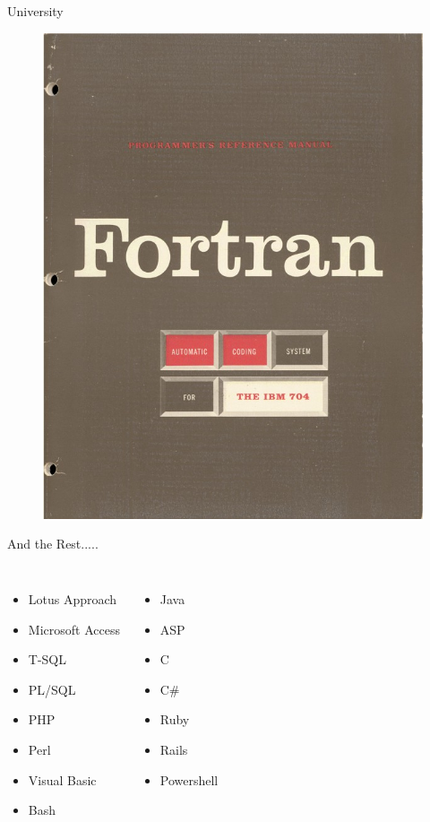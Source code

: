 \documentclass{beamer}
\begin{document}
\begin{frame}{University}
\begin{figure}
      \includegraphics[scale=0.1]{images/fortran}
    \end{figure}
  \end{frame}

  \begin{frame}{And the Rest.....}
    \begin{columns}
          \begin{itemize}
            \item Lotus Approach
            \item Microsoft Access
            \item T-SQL
            \item PL/SQL
            \item PHP
            \item Perl
            \item Visual Basic
            \item Bash
          \end{itemize}
          \begin{itemize}
            \item Java
            \item ASP
            \item C
            \item C\#
            \item Ruby
            \item Rails
            \item Powershell
          \end{itemize}
      \end{columns}
  \end{frame}
\end{document}

